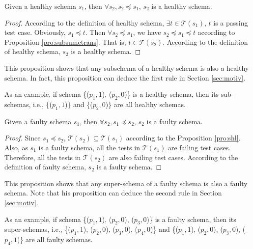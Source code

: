 \begin{proposition}\label{pro:subofhealthy}
Given a healthy schema $s_{1}$, then $\forall s_{2}, s_{2} \preceq s_{1}$, $s_{2}$ is a healthy schema.
\end{proposition}

\begin{proof}
According to the definition of healthy schema,  $\exists t \in \mathcal{T}(s_{1})$, $t$ is a passing test case.  Obviously, $s_{1} \preceq t$.  Then $\forall s_{2} \preceq  s_{1}$, we have $s_{2} \preceq s_{1} \preceq t$ according to Proposition \ref{pro:subsumetrans}. That is, $t \in \mathcal{T}(s_{2})$. According to the definition of healthy schema, $s_{2}$ is a healthy schema.
\end{proof}

This proposition shows that any subschema of a healthy schema is also a healthy schema. In fact, this proposition can deduce the first rule in Section \ref{sec:motiv}.

As an example, if schema  \{($p_{1}, 1$), ($p_{2}, 0$)\} is a healthy schema, then its sub-schemas, i.e., \{($p_{1}, 1$)\} and \{($p_{2}, 0$)\} are all healthy schemas.


\begin{proposition}\label{pro:superoffaulty}
Given a faulty schema $s_{1}$, then $\forall s_{2}, s_{1} \preceq s_{2}$, $s_{2}$ is a faulty schema.
\end{proposition}


\begin{proof}
 Since $s_{1} \preceq s_{2}$,  $\mathcal{T}(s_{2}) \subseteq \mathcal{T}(s_{1})$ according to the Proposition \ref{pro:shl}. Also, as $s_{1}$ is a faulty schema, all the tests in $\mathcal{T}(s_{1})$ are failing test cases. Therefore, all the tests in $\mathcal{T}(s_{2})$ are also failing test cases.  According to the definition of faulty schema, $s_{2}$ is a faulty schema.
\end{proof}

This proposition shows that any super-schema of a faulty schema is also a faulty schema.  Note that his proposition can deduce the second rule in Section \ref{sec:motiv}.

As an example, if schema  \{($p_{1}, 1$), ($p_{2}, 0$), ($p_{3}, 0$)\} is a faulty schema, then its super-schemas, i.e., \{($p_{1}, 1$), ($p_{2}, 0$), ($p_{3}, 0$), ($p_{4}, 0$)\} and \{($p_{1}, 1$), ($p_{2}, 0$), ($p_{3}, 0$), ($p_{4}, 1$)\} are all faulty schemas.


